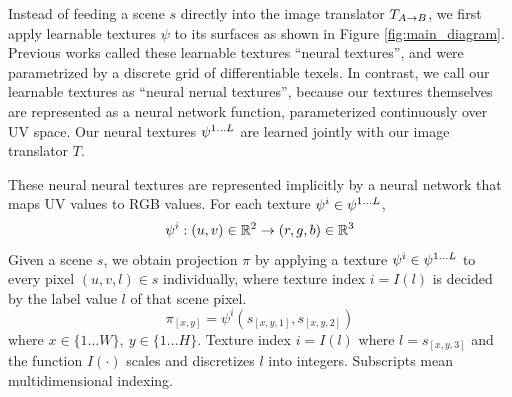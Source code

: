 \documentclass{article}
\begin{document}

		Instead of feeding a scene $s$ directly into the image translator $T_{A\rightarrow B}$, we first apply learnable textures $\psi$ to its surfaces as shown in Figure \ref{fig:main_diagram}.
		Previous works called these learnable textures ``neural textures'', and were parametrized by a discrete grid of differentiable texels. 
		In contrast, we call our learnable textures as ``neural nerual textures'', because our textures themselves are represented as a neural network function, parameterized continuously over UV space.
		Our neural textures $\psi^{1\dots L}$ are learned jointly with our image translator $T$.
		
		These neural neural textures are represented implicitly by a neural network that maps UV values to RGB values. %
		For each texture $\psi^i \in \psi^{1\dots L}$, 
		\begin{equation}
			\psi^i: (u,v) \in\real^2 \rightarrow (r,g,b) \in\real^3 %
		\end{equation}
		Given a scene $s$, we obtain projection $\pi$ by applying a texture $\psi^i \in \psi^{1\dots L}$ to every pixel $(u,v,l) \in s$ individually, where texture index $i=I(l)$ is decided by the label value $l$ of that scene pixel.
		\begin{equation}
			\pi_{[x,y]}=\psi^i(s_{[x,y,1]},s_{[x,y,2]})
		\end{equation}
		where $ x\in \{1\dots W\},\ y\in \{1\dots H\}$. Texture index $i = I(l)$ where $l=s_{[x,y,3]}$ and the function $I(\cdot)$ scales and discretizes $l$ into integers. Subscripts mean multidimensional indexing.
\end{document}

